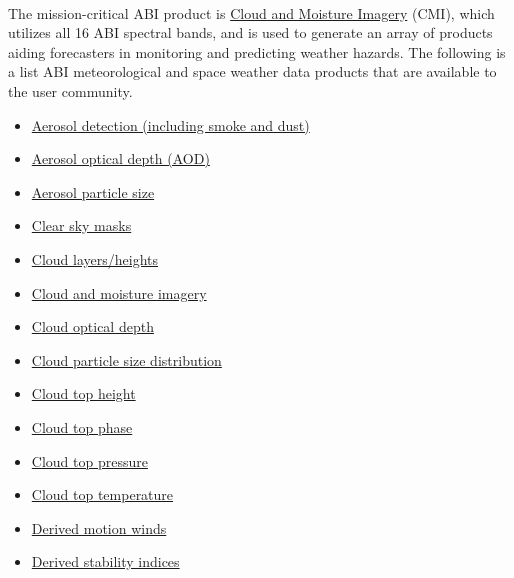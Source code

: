 \paragraph{}
The mission-critical ABI product is \href{https://www.goes-r.gov/products/baseline-cloud-moisture-imagery.html}{Cloud and Moisture Imagery} (CMI), which utilizes all 16 ABI spectral bands,
and is used to generate an array of products aiding forecasters in monitoring and predicting weather hazards.
The following is a list ABI meteorological and space weather data products that are available to the user community.
\begin{itemize} 
\item \href{https://www.goes-r.gov/products/baseline-aerosol-detection.html}{Aerosol detection (including smoke and dust)} 
\item \href{https://www.goes-r.gov/products/baseline-aerosol-opt-depth.html}{Aerosol optical depth (AOD)}
\item \href{https://www.goes-r.gov/products/opt2-aerosol-particle-size.html}{Aerosol particle size}
\item \href{https://www.goes-r.gov/products/baseline-clear-sky-mask.html}{Clear sky masks}
\item \href{https://www.goes-r.gov/products/opt2-cloud-layers-height.html}{Cloud layers/heights}
\item \href{https://www.goes-r.gov/products/baseline-cloud-moisture-imagery.html}{Cloud and moisture imagery}
\item \href{https://www.goes-r.gov/products/baseline-cloud-opt-depth.html}{Cloud optical depth}
\item \href{https://www.goes-r.gov/products/baseline-cloud-particle-size-dist.html}{Cloud particle size distribution}
\item \href{https://www.goes-r.gov/products/baseline-cloud-top-height-cloud-layer.html}{Cloud top height} 
\item \href{https://www.goes-r.gov/products/baseline-cloud-phase.html}{Cloud top phase}
\item \href{https://www.goes-r.gov/products/baseline-cloud-top-pressure.html}{Cloud top pressure}
\item \href{https://www.goes-r.gov/products/baseline-cloud-top-temp.html}{Cloud top temperature}
\item \href{https://www.goes-r.gov/products/baseline-derived-motion-winds.html}{Derived motion winds}
\item \href{https://www.goes-r.gov/products/baseline-derived-stability-indices.html}{Derived stability indices}

\end{itemize}
